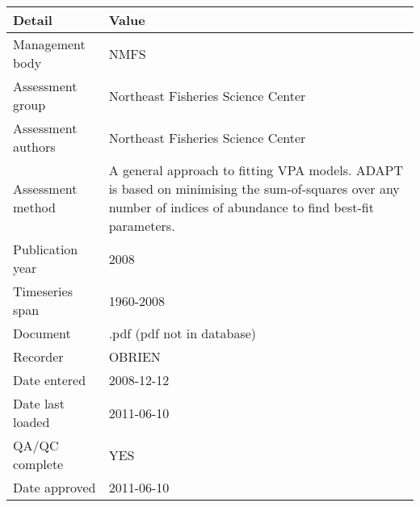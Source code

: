 \begin{table}[htb]
\centering
\begin{tabular}{lp{7cm}}
\toprule
Detail & Value \\
\midrule
Management body    & NMFS                                                                                                                                                           \\
Assessment group   & Northeast Fisheries Science Center                                                                                                                             \\
Assessment authors & Northeast Fisheries Science Center                                                                                                                             \\
Assessment method  & A general approach to fitting VPA models. ADAPT is based on minimising the sum-of-squares over any number of indices of abundance to find best-fit parameters. \\
Publication year   & 2008                                                                                                                                                           \\
Timeseries span    & 1960-2008                                                                                                                                                      \\
Document           & .pdf (pdf not in database)                                                                                                                                     \\
Recorder           & OBRIEN                                                                                                                                                         \\
Date entered       & 2008-12-12                                                                                                                                                     \\
Date last loaded   & 2011-06-10                                                                                                                                                     \\
QA/QC complete     & YES                                                                                                                                                            \\
Date approved      & 2011-06-10                                                                                                                                                     \\
\bottomrule
\end{tabular}
\label{tab:assessdet}
\end{table}

